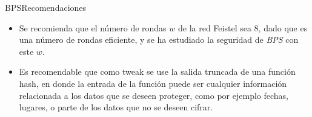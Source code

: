 \begin{frame}{BPS}{Recomendaciones}

  \begin{itemize}
    \item Se recomienda que el número de rondas $w$ de la red Feistel sea 
      $8$, dado que es una número de rondas eficiente, y se ha estudiado 
      la seguridad de \textit{BPS} con este $w$.
    
    \item Es recomendable que como tweak se use la salida truncada de una 
      función hash, en donde la entrada de la función puede ser cualquier 
      información relacionada a los datos que se deseen proteger, como por 
      ejemplo fechas, lugares, o parte de los datos que no se deseen cifrar. 
  \end{itemize}
  
\end{frame}

